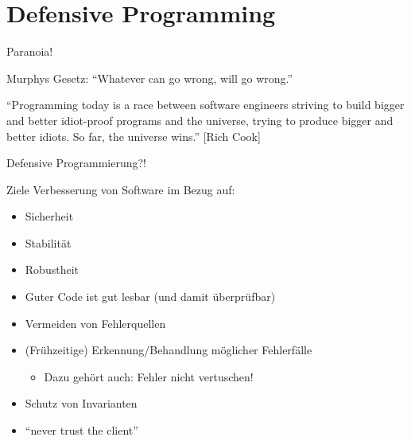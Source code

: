 \section{Defensive Programming}
\begin{frame}{Paranoia!}
	\begin{itemize}
	\end{itemize}
\end{frame}

\begin{frame}{Defensive Programmierung?!}	
	\begin{block}{Ziele}
		Verbesserung von Software im Bezug auf:
		\begin{itemize}
			\item Sicherheit
			\item Stabilität
			\item Robustheit
		\end{itemize}
	\end{block}
	
	\begin{itemize}
		\item Guter Code ist gut lesbar (und damit überprüfbar)
		\item Vermeiden von Fehlerquellen
		\item (Frühzeitige) Erkennung/Behandlung möglicher Fehlerfälle
		\begin{itemize}
			\item Dazu gehört auch: Fehler nicht vertuschen!
		\end{itemize}
		\item Schutz von Invarianten
		\item \enquote{never trust the client}
	\end{itemize}
\end{frame}

